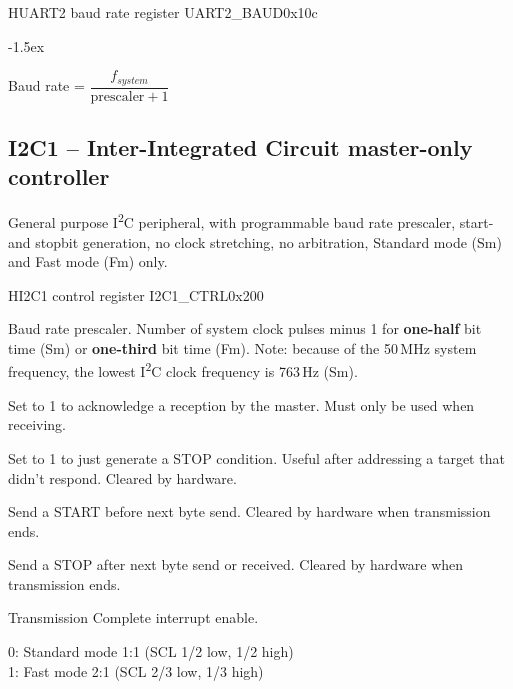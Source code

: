 \documentclass[12pt]{article}
\begin{document}
\begin{register}{H}{UART2 baud rate register UART2\_BAUD}{0x10c}
\label{uart2baud}
%
\regnewline%
\end{register}
\begin{regdesc}[0.6\textwidth]\begin{reglist}[000000000]
\itemsep-1.5ex
\item[PRESCALER] Baud rate = $\dfrac{f_{system}}{\textrm{prescaler}+1}$
\end{reglist}\end{regdesc}


\subsection{I2C1 -- Inter-Integrated Circuit master-only controller}
General purpose I\textsuperscript{2}C peripheral, with programmable baud rate prescaler, start- and stopbit generation, no clock stretching, no arbitration, Standard mode (Sm) and Fast mode (Fm) only.

\begin{register}{H}{I2C1 control register I2C1\_CTRL}{0x200}
\label{i2c1ctrl}
%
%
%
%
%
%
%
%
%
\regnewline%
\end{register}
\begin{regdesc}[0.9\textwidth]\begin{reglist}[000000000]
\item [BAUD] Baud rate prescaler. Number of system clock pulses minus 1 for \textbf{one-half} bit time (Sm) or \textbf{one-third} bit time (Fm).
Note: because of the 50\,MHz system frequency, the lowest I\textsuperscript{2}C clock frequency is 763\,Hz (Sm).
\item [MACK] Set to 1 to acknowledge a reception by the master. Must only be used when receiving.
\item [HARDSTOP] Set to 1 to just generate a STOP condition. Useful after addressing a target that didn't respond. Cleared by hardware.
\item [START] Send a START before next byte send. Cleared by hardware when transmission ends.
\item [STOP] Send a STOP after next byte send or received. Cleared by hardware when transmission ends.
\item [TCIE] Transmission Complete interrupt enable.
\item [FM] 0: Standard mode 1:1 (SCL 1/2 low, 1/2 high)\\1: Fast mode 2:1 (SCL 2/3 low, 1/3 high)
\end{reglist}\end{regdesc}
\end{document}

